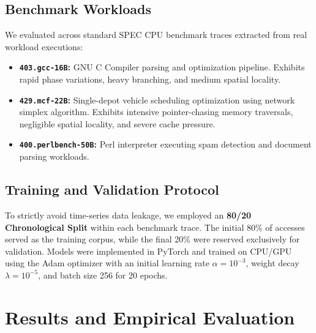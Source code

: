 \documentclass[conference]{IEEEtran}
\begin{document}
\subsection{Benchmark Workloads}
We evaluated across standard SPEC CPU benchmark traces extracted from real workload executions:
\begin{itemize}
    \item \textbf{\texttt{403.gcc-16B}:} GNU C Compiler parsing and optimization pipeline. Exhibits rapid phase variations, heavy branching, and medium spatial locality.
    \item \textbf{\texttt{429.mcf-22B}:} Single-depot vehicle scheduling optimization using network simplex algorithm. Exhibits intensive pointer-chasing memory traversals, negligible spatial locality, and severe cache pressure.
    \item \textbf{\texttt{400.perlbench-50B}:} Perl interpreter executing spam detection and document parsing workloads.
\end{itemize}

\subsection{Training and Validation Protocol}
To strictly avoid time-series data leakage, we employed an \textbf{80/20 Chronological Split} within each benchmark trace. The initial 80\% of accesses served as the training corpus, while the final 20\% were reserved exclusively for validation. Models were implemented in PyTorch and trained on CPU/GPU using the Adam optimizer with an initial learning rate $\alpha = 10^{-3}$, weight decay $\lambda = 10^{-5}$, and batch size 256 for 20 epochs.

\section{Results and Empirical Evaluation}
\end{document}
